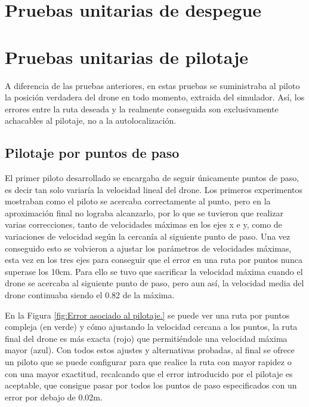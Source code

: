 \section{Pruebas unitarias de despegue}



\section{Pruebas unitarias de pilotaje}
\hspace{1cm} A diferencia de las pruebas anteriores, en estas pruebas se suministraba al piloto la posición verdadera del drone en todo momento, extraida del simulador. Así, los errores entre la ruta deseada y la realmente conseguida son exclusivamente achacables al pilotaje, no a la autolocalización. 

\subsection{Pilotaje por puntos de paso}
\hspace{1cm} El primer piloto desarrollado se encargaba de seguir únicamente puntos de paso, es decir tan solo variaría la velocidad lineal del drone. Los primeros experimentos mostraban como el piloto se acercaba correctamente al punto, pero en la aproximación final no lograba alcanzarlo, por lo que se tuvieron que realizar varias correcciones, tanto de velocidades máximas en los ejes x e y, como de variaciones de velocidad según la cercanía al siguiente punto de paso. Una vez conseguido esto se volvieron a ajustar los parámetros de velocidades máximas, esta vez en los tres ejes para conseguir que el error en una ruta por puntos nunca superase los 10cm. Para ello se tuvo que sacrificar la velocidad máxima cuando el drone se acercaba al siguiente punto de paso, pero aun así, la velocidad media del drone continuaba siendo el 0.82 de la máxima.

\hspace{1cm} En la Figura \ref{fig:Error asociado al pilotaje.} se puede ver una ruta por puntos compleja (en verde) y cómo ajustando la velocidad cercana a los puntos, la ruta final del drone es más exacta (rojo) que permitiéndole una velocidad máxima mayor (azul). Con todos estos ajustes y alternativas probadas, al final se ofrece un piloto que se puede configurar para que realice la ruta con mayor rapidez o con una mayor exactitud, recalcando que el error introducido por el pilotaje es aceptable, que consigue pasar por todos los puntos de paso especificados con un error por debajo de 0.02m.

